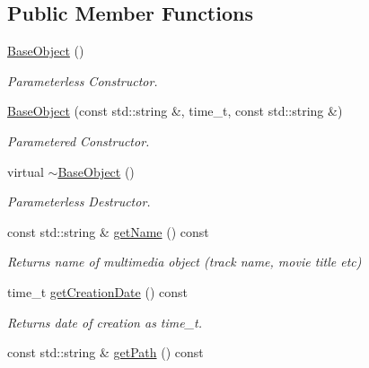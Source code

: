 \subsection*{Public Member Functions}
\begin{DoxyCompactItemize}
\item 
\hypertarget{classBaseObject_ac9e64a371856dc974183c1b04bfdd0c9}{\hyperlink{classBaseObject_ac9e64a371856dc974183c1b04bfdd0c9}{Base\+Object} ()}\label{classBaseObject_ac9e64a371856dc974183c1b04bfdd0c9}

\begin{DoxyCompactList}\small\item\em Parameterless Constructor. \end{DoxyCompactList}\item 
\hypertarget{classBaseObject_a17f97975dac448e2b3ce74f2a91ef58d}{\hyperlink{classBaseObject_a17f97975dac448e2b3ce74f2a91ef58d}{Base\+Object} (const std\+::string \&, time\+\_\+t, const std\+::string \&)}\label{classBaseObject_a17f97975dac448e2b3ce74f2a91ef58d}

\begin{DoxyCompactList}\small\item\em Parametered Constructor. \end{DoxyCompactList}\item 
virtual \hyperlink{classBaseObject_a83eecfd3bdaffda4e6c7d0fb98747f96}{$\sim$\+Base\+Object} ()
\begin{DoxyCompactList}\small\item\em Parameterless Destructor. \end{DoxyCompactList}\item 
\hypertarget{classBaseObject_a3fb1249b695ba6e93d943a4c42a97b76}{const std\+::string \& \hyperlink{classBaseObject_a3fb1249b695ba6e93d943a4c42a97b76}{get\+Name} () const }\label{classBaseObject_a3fb1249b695ba6e93d943a4c42a97b76}

\begin{DoxyCompactList}\small\item\em Returns name of multimedia object (track name, movie title etc) \end{DoxyCompactList}\item 
\hypertarget{classBaseObject_a1d9abdd27cea258333a27d505c57e857}{time\+\_\+t \hyperlink{classBaseObject_a1d9abdd27cea258333a27d505c57e857}{get\+Creation\+Date} () const }\label{classBaseObject_a1d9abdd27cea258333a27d505c57e857}

\begin{DoxyCompactList}\small\item\em Returns date of creation as time\+\_\+t. \end{DoxyCompactList}\item 
\hypertarget{classBaseObject_a308eb98d8d6dd266c8d4be254754b092}{const std\+::string \& \hyperlink{classBaseObject_a308eb98d8d6dd266c8d4be254754b092}{get\+Path} () const }\label{classBaseObject_a308eb98d8d6dd266c8d4be254754b092}


\end{DoxyCompactItemize}
